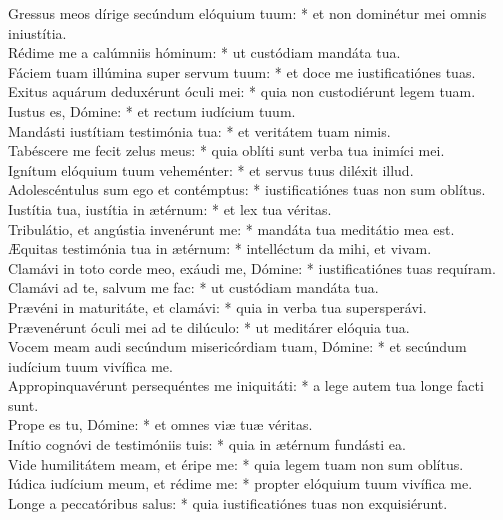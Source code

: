 {	Gressus meos dírige secúndum elóquium tuum: * et non dominétur mei omnis iniustítia. \\
	Rédime me a calúmniis hóminum: * ut custódiam mandáta tua. \\
	Fáciem tuam illúmina super servum tuum: * et doce me iustificatiónes tuas. \\
	Exitus aquárum deduxérunt óculi mei: * quia non custodiérunt legem tuam. \\
	Iustus es, Dómine: * et rectum iudícium tuum. \\
	Mandásti iustítiam testimónia tua: * et veritátem tuam nimis. \\
	Tabéscere me fecit zelus meus: * quia oblíti sunt verba tua inimíci mei. \\
	Ignítum elóquium tuum veheménter: * et servus tuus diléxit illud. \\
	Adolescéntulus sum ego et contémptus: * iustificatiónes tuas non sum oblítus. \\
	Iustítia tua, iustítia in ætérnum: * et lex tua véritas. \\
	Tribulátio, et angústia invenérunt me: * mandáta tua meditátio mea est. \\
	Æquitas testimónia tua in ætérnum: * intelléctum da mihi, et vivam. \\
	Clamávi in toto corde meo, exáudi me, Dómine: * iustificatiónes tuas requíram. \\
	Clamávi ad te, salvum me fac: * ut custódiam mandáta tua. \\
	Prævéni in maturitáte, et clamávi: * quia in verba tua supersperávi. \\
	Prævenérunt óculi mei ad te dilúculo: * ut meditárer elóquia tua. \\
	Vocem meam audi secúndum misericórdiam tuam, Dómine: * et secúndum iudícium tuum vivífica me. \\
	Appropinquavérunt persequéntes me iniquitáti: * a lege autem tua longe facti sunt. \\
	Prope es tu, Dómine: * et omnes viæ tuæ véritas. \\
	Inítio cognóvi de testimóniis tuis: * quia in ætérnum fundásti ea. \\
	Vide humilitátem meam, et éripe me: * quia legem tuam non sum oblítus. \\
	Iúdica iudícium meum, et rédime me: * propter elóquium tuum vivífica me. \\
	Longe a peccatóribus salus: * quia iustificatiónes tuas non exquisiérunt. \\
}

